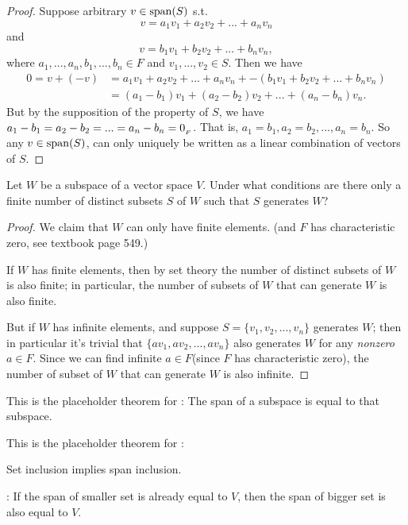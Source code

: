 \begin{proof}
Suppose arbitrary \(v \in \operatorname{span}(S)\) s.t.
\[
    v = a_1 v_1 + a_2 v_2 + ... + a_n v_n
\]
and
\[
    v = b_1 v_1 + b_2 v_2 + ... + b_n v_n,
\]
where \(a_1, ..., a_n, b_1, ..., b_n \in F\) and \(v_1, ..., v_2 \in S\).
Then we have
\begin{align*}
    0 = v + (-v) & = a_1 v_1 + a_2 v_2 + ... + a_n v_n + -(b_1 v_1 + b_2 v_2 + ... + b_n v_n) \\
                 & = (a_1 - b_1) v_1 + (a_2 - b_2) v_2 + ... + (a_n - b_n) v_n.
\end{align*}
But by the supposition of the property of \(S\), we have \(a_1 - b_1 = a_2 - b_2 = ... = a_n - b_n = 0_{_F}\).
That is, \(a_1 = b_1, a_2 = b_2, ..., a_n = b_n\).
So any \(v \in \operatorname{span}(S)\), can only uniquely be written as a linear combination of vectors of \(S\).
\end{proof}

\begin{exercise} \label{exercise 1.4.17}
Let \(W\) be a subspace of a vector space \(V\).
Under what conditions are there only a finite number of distinct subsets \(S\) of \(W\) such that \(S\) generates \(W\)?
\end{exercise}

\begin{proof}
We claim that \(W\) can only have finite elements. (and \(F\) has characteristic zero, see textbook page 549.)

If \(W\) has finite elements, then by set theory the number of distinct subsets of \(W\) is also finite;
in particular, the number of subsets of \(W\) that can generate \(W\) is also finite.

But if \(W\) has infinite elements, and suppose \(S = \{v_1, v_2, ..., v_n\}\) generates \(W\);
then in particular it's trivial that \(\{a v_1, a v_2, ..., a v_n\}\) also generates \(W\) for any \emph{nonzero} \(a \in F\).
Since we can find infinite \(a \in F\)(since \(F\) has characteristic zero), the number of subset of \(W\) that can generate \(W\) is also infinite.
\end{proof}

\begin{additional theorem} \label{athm 1.11}
This is the placeholder theorem for : The span of a subspace is equal to that subspace.
\end{additional theorem}

\begin{additional theorem} \label{athm 1.12}
This is the placeholder theorem for :

 Set inclusion implies span inclusion.

: If the span of smaller set is already equal to \(V\), then the span of bigger set is also equal to \(V\).
\end{additional theorem}

